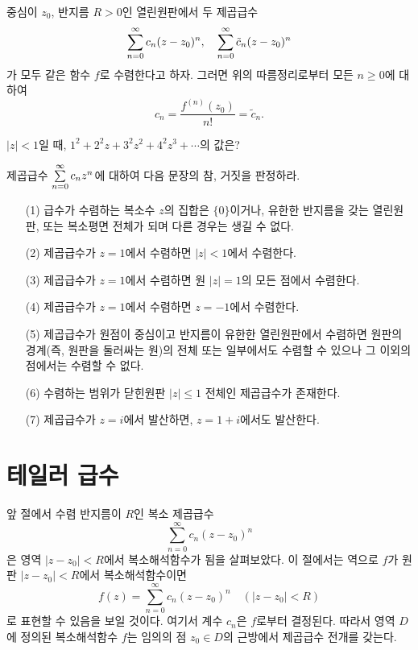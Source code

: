 \begin{salt_remark}  \label{rem-4-2}
중심이 $z_0$, 반지름 $R>0$인 열린원판에서
두 제곱급수
\[
\Sum_{n=0}^\infty c_n(z-z_0)^n, \quad %
\Sum_{n=0}^\infty \tilde c_n(z-z_0)^n
\]
가 모두 같은 함수 $f$로 수렴한다고 하자.
그러면 위의 따름정리로부터 모든 $n\ge0$에 대하여
\[
c_n = \dfrac{f^{(n)}(z_0)}{n!} = \tilde c_n.
\]
\end{salt_remark}

\begin{salt_exercise} \label{ex-4-10}
$|z|<1$일 때,
$1^2 + 2^2z + 3^2z^2 + 4^2z^3 + \cdots$의 값은?
\end{salt_exercise}

\begin{salt_exercise} \label{ex-4-11}
제곱급수 $\sum\limits_{n=0}^\infty c_nz^n$에 대하여 다음 문장의 참, 거짓을 판정하라.
\begin{itemize}
\item[(1)] 급수가 수렴하는  복소수 $z$의 집합은 $\{0\}$이거나, 유한한 반지름을 갖는 열린원판,
또는 복소평면 전체가 되며 다른 경우는 생길 수 없다.
\item[(2)] 제곱급수가 $z=1$에서 수렴하면 $|z|<1$에서 수렴한다.
\item[(3)] 제곱급수가 $z=1$에서 수렴하면 원 $|z|=1$의 모든 점에서 수렴한다.
\item[(4)] 제곱급수가 $z=1$에서 수렴하면 $z=-1$에서 수렴한다.
\item[(5)] 제곱급수가 원점이 중심이고 반지름이 유한한 열린원판에서 수렴하면
원판의 경계(즉, 원판을 둘러싸는 원)의 전체 또는 일부에서도 수렴할 수 있으나
그 이외의 점에서는 수렴할 수 없다.
\item[(6)] 수렴하는 범위가 닫힌원판 $|z|\le 1$ 전체인 제곱급수가 존재한다.
\item[(7)] 제곱급수가 $z=i$에서 발산하면, $z=1+i$에서도 발산한다.
\end{itemize}
\end{salt_exercise}

\section{테일러 급수} \label{section-4-3}

앞 절에서 수렴 반지름이 $R$인 복소 제곱급수
\[
\sum_{n=0}^\infty c_n(z-z_0)^n
\]
은 영역 $|z-z_0|<R$에서 복소해석함수가 됨을 살펴보았다.
이 절에서는 역으로 $f$가 원판 $|z-z_0|<R$에서 복소해석함수이면
\[
f(z) = \sum_{n=0}^\infty c_n (z-z_0)^n \quad (|z-z_0|<R)
\]
로 표현할 수 있음을 보일 것이다. 여기서 계수 $c_n$은 $f$로부터 결정된다.
따라서 영역 $D$에 정의된 복소해석함수 $f$는 임의의 점 $z_0\in D$의 근방에서
제곱급수 전개를 갖는다.

